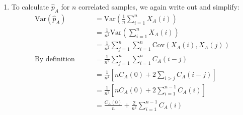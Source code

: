 \documentclass[12pt]{article}
\theoremstyle{plain}
\theoremstyle{definition}
\theoremstyle{remark}
\begin{document}
\begin{enumerate}
\begin{enumerate}
      \item %
        To calculate $\hat{p}_A$ for $n$ correlated samples, we again
        write out and simplify:
        \begin{align*}
          \text{Var}(\hat{p}_A)
          &=\text{Var}\left( \frac{1}{n} \sum^n_{i=1} X_A(i)\right) \\
          &= \frac{1}{n^2} \text{Var}\left( \sum^n_{i=1} X_A(i)\right) \\
          &= \frac{1}{n^2} \sum^n_{j=1}\sum^n_{i=1}
            \text{Cov}\left(X_A(i), X_A(j)\right)\\
          \text{By definition} \qquad
            &= \frac{1}{n^2} \sum^n_{j=1}\sum^n_{i=1} C_A(i-j) \\
          &= \frac{1}{n^2}
            \left[ n C_A(0) + 2 \sum_{i>j} C_A(i-j) \right] \\
          &= \frac{1}{n^2}
            \left[ n C_A(0) + 2 \sum^{n-1}_{i=1} C_A(i) \right] \\
          &= \frac{C_A(0)}{n}
            + \frac{2}{n^2} \sum^{n-1}_{i=1} C_A(i)
        \end{align*}


    \end{enumerate}

\end{enumerate}



\end{document}
